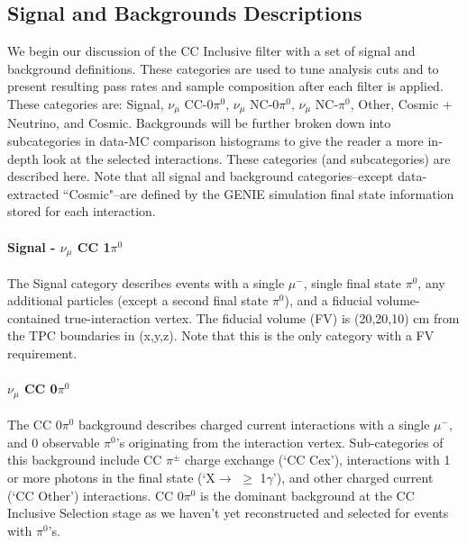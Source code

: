 \subsection{Signal and Backgrounds Descriptions}
\par We begin our discussion of the CC Inclusive filter with a set of signal and background definitions.  These categories are used to tune analysis cuts and to present resulting pass rates and sample composition after each filter is applied.  These categories are: Signal, $\nu_\mu$ CC-0$\pi^0$, $\nu_\mu$ NC-0$\pi^0$, $\nu_\mu$ NC-$\pi^0$, Other, Cosmic + Neutrino, and Cosmic. Backgrounds will be further broken down into subcategories in data-MC comparison histograms to give the reader a more in-depth look at the selected interactions.  These categories (and subcategories) are described here. Note that all signal and background categories--except data-extracted ``Cosmic"--are defined by the GENIE simulation final state information stored for each interaction.


\paragraph{Signal - $\nu_\mu$ CC 1$\pi^0$} The Signal category describes events with a single $\mu^-$, single final state $\pi^0$, any additional particles (except a second final state $\pi^0$), and a fiducial volume-contained true-interaction vertex. The fiducial volume (FV) is (20,20,10) cm from the TPC boundaries in (x,y,z). Note that this is the only category with a FV requirement.

\paragraph{ $\nu_\mu$ CC 0$\pi^0$}
The CC 0$\pi^0$ background describes charged current interactions with a single $\mu^-$, and 0 observable $\pi^0$'s originating from the interaction vertex.  Sub-categories of this background include CC $\pi^{\pm}$ charge exchange (`CC Cex'), interactions with 1 or more photons in the final state (`X$\rightarrow$ $\geq$ 1$\gamma$'), and other charged current (`CC Other') interactions. CC 0$\pi^0$ is the dominant background at the CC Inclusive Selection stage as we haven't yet reconstructed and selected for events with $\pi^0$'s.

